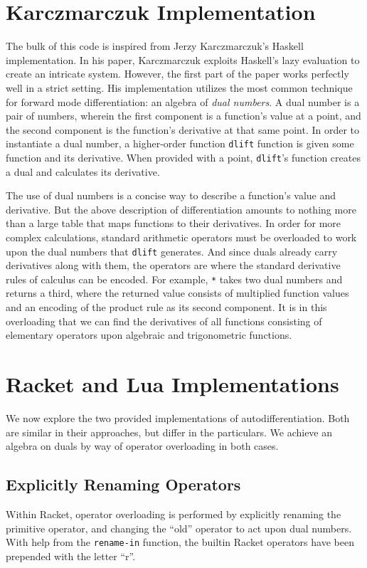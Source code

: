 \documentclass[font=9pt]{article}
\begin{document}
\section{Karczmarczuk Implementation}
The bulk of this code is inspired from Jerzy Karczmarczuk's Haskell
implementation\cite{autodiff}.  In his paper, Karczmarczuk exploits Haskell's lazy
evaluation to create an intricate system.  However, the first part of the
paper works perfectly well in a strict setting.  His implementation utilizes the
most common technique for forward mode differentiation: an algebra of
\textit{dual numbers}.  A dual number is a pair of numbers, wherein the first
component is a function's value at a point, and the second component is the
function's derivative at that same point. In order to instantiate a dual number,
a higher-order function \lstinline{dlift} function is given some function and its
derivative.  When provided with a point, \lstinline{dlift}'s function creates
a dual and calculates its derivative.

The use of dual numbers is a concise way to describe a function's value and
derivative.  But the above description of differentiation amounts to nothing
more than a large table that maps functions to their derivatives.  In order for
more complex calculations, standard arithmetic operators must be
overloaded to work upon the dual numbers that \lstinline{dlift} generates.  And
since duals already carry derivatives along with them, the operators are where
the standard derivative rules of calculus can be encoded.  For example,
\lstinline{*} takes two dual numbers and returns a third, where the returned value
consists of multiplied function values and an encoding of the product rule as
its second component.  It is in this overloading that we can find the
derivatives of all functions consisting of elementary operators upon algebraic
and trigonometric functions.

\section{Racket and Lua Implementations}
We now explore the two provided implementations of autodifferentiation.  Both
are similar in their approaches, but differ in the particulars.  We achieve an
algebra on duals by way of operator overloading in both cases.

\subsection{Explicitly Renaming Operators}
Within Racket, operator overloading is performed by explicitly renaming the
primitive operator, and changing the ``old'' operator to act upon dual numbers.
With help from the \lstinline{rename-in} function, the builtin Racket operators
have been prepended with the letter ``r''.
\end{document}
